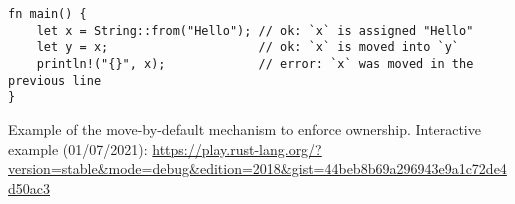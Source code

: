 \begin{listing}
    \begin{verbatim}
fn main() {
    let x = String::from("Hello"); // ok: `x` is assigned "Hello"
    let y = x;                     // ok: `x` is moved into `y`
    println!("{}", x);             // error: `x` was moved in the previous line
}
    \end{verbatim}
    \caption{Example of the move-by-default mechanism to enforce ownership. Interactive example (01/07/2021): \url{https://play.rust-lang.org/?version=stable&mode=debug&edition=2018&gist=44beb8b69a296943e9a1c72de4d50ac3}}
    \label{lst:rust-move}
\end{listing}